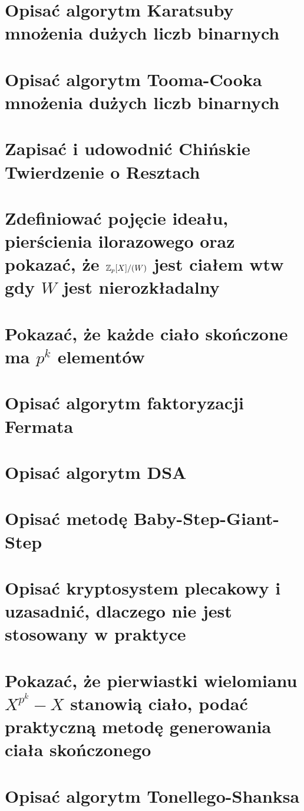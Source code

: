\section{Opisać algorytm Karatsuby mnożenia dużych liczb binarnych}


\section{Opisać algorytm Tooma-Cooka mnożenia dużych liczb binarnych}


\section{Zapisać i udowodnić Chińskie Twierdzenie o Resztach}


\section{Zdefiniować pojęcie ideału, pierścienia ilorazowego oraz pokazać, że \( \mathbb{Z}_p[X]/(W) \) jest ciałem wtw gdy \( W \) jest nierozkładalny} 

\section{Pokazać, że każde ciało skończone ma \( p^k \) elementów}


\section{Opisać algorytm faktoryzacji Fermata}


\section{Opisać algorytm DSA}


\section{Opisać metodę Baby-Step-Giant-Step}


\section{Opisać kryptosystem plecakowy i uzasadnić, dlaczego nie jest stosowany w praktyce}


\newpage
\section{Pokazać, że pierwiastki wielomianu \( X^{p^k} - X \) stanowią ciało, podać praktyczną metodę generowania ciała skończonego}



\section{Opisać algorytm Tonellego-Shanksa}
